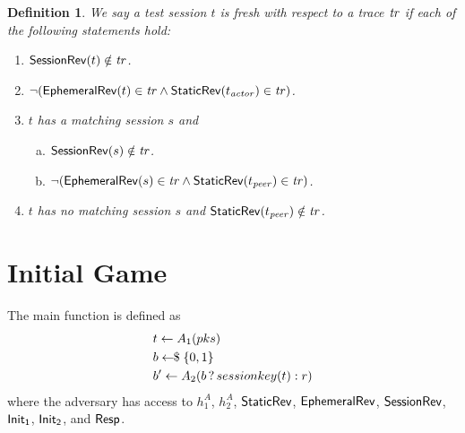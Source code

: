 \documentclass[]{article}
\newtheorem{definition}{Definition}
\begin{document}
\begin{definition}
We say a test session $t$ is fresh with respect to a trace $\mathit{tr}$ if each of the following
  statements hold:
\begin{enumerate}
\item $\mathsf{SessionRev}(t) \notin \mathit{tr}$.
\item $\neg (\mathsf{EphemeralRev}(t) \in \mathit{tr} \land \mathsf{StaticRev}(t_{\mathit{actor}}) \in \mathit{tr})$.
\item $t$ has a matching session $s$ and
  \begin{enumerate}[a)]
    \item $\mathsf{SessionRev}(s) \notin \mathit{tr}$.
    \item $\neg (\mathsf{EphemeralRev}(s) \in \mathit{tr} \land \mathsf{StaticRev}(t_{\mathit{peer}}) \in \mathit{tr})$.
  \end{enumerate}
\item $t$ has no matching session $s$ and $\mathsf{StaticRev}(t_{\mathit{peer}}) \notin \mathit{tr}$.
\end{enumerate}
\end{definition}

\section{Initial Game}

The main function is defined as
\begin{align*}
& t \leftarrow A_1(pks) \\
& b \leftarrow\!\!\small{\$} \; \{0,1\} \\
& b' \leftarrow A_2(b\, ?\, sessionkey(t) : r)
\end{align*}
where the adversary has access to $h_1^A$, $h_2^A$, $\mathsf{StaticRev}$,
  $\mathsf{EphemeralRev}$, $\mathsf{SessionRev}$, $\mathsf{Init_1}$, $\mathsf{Init_2}$, and $\mathsf{Resp}$.

\newcommand{\Ake}{\mathsf{AKE}}
\newcommand{\Ev}[1]{\mathit{Ev}_{#1}}
\newcommand{\fresh}{\mathit{fresh}}
\end{document}
